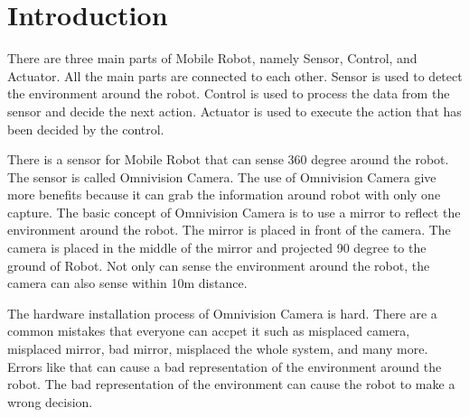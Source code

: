 \section{Introduction}
\label{sec:introduction}

There are three main parts of Mobile Robot, namely Sensor, Control, and Actuator. All the main parts are connected to each other. Sensor is used to detect the environment around the robot. Control is used to process the data from the sensor and decide the next action. Actuator is used to execute the action that has been decided by the control.  
 
There is a sensor for Mobile Robot that can sense 360 degree around the robot. The sensor is called Omnivision Camera. The use of Omnivision Camera give more benefits because it can grab the information around robot with only one capture. The basic concept of Omnivision Camera is to use a mirror to reflect the environment around the robot. The mirror is placed in front of the camera. The camera is placed in the middle of the mirror and projected 90 degree to the ground of Robot. Not only can sense the environment around the robot, the camera can also sense within 10m distance. 

The hardware installation process of Omnivision Camera is hard. There are a common mistakes that everyone can accpet it such as misplaced camera, misplaced mirror, bad mirror, misplaced the whole system, and many more. Errors like that can cause a bad representation of the environment around the robot. The bad representation of the environment can cause the robot to make a wrong decision. 